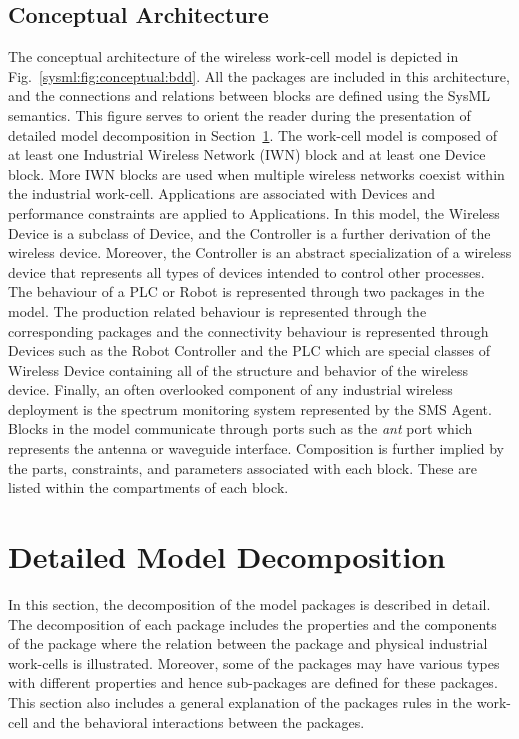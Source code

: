 \subsection{Conceptual Architecture}\label{sysml:sec:architecture}
The conceptual architecture of the wireless work-cell model is depicted in Fig.~\ref{sysml:fig:conceptual:bdd}. All the packages are included in this architecture, and the connections and relations between blocks are defined using the SysML semantics. This figure serves to orient the reader during the presentation of detailed model decomposition in Section~\ref{sysml:sec:detailed-model}. The work-cell model is composed of at least one Industrial Wireless Network (IWN) block and at least one Device block. More IWN blocks are used when multiple wireless networks coexist within the industrial work-cell. Applications are associated with Devices and performance constraints are applied to Applications. In this model, the Wireless Device is a subclass of Device, and the Controller is a further derivation of the wireless device. Moreover, the Controller is an abstract specialization of a wireless device that represents all types of devices intended to control other processes. The behaviour of a PLC or Robot is represented through two packages in the model. The production related behaviour is represented through the corresponding packages and the connectivity behaviour is represented through Devices such as the Robot Controller and the PLC which are special classes of Wireless Device containing all of the structure and behavior of the wireless device. Finally, an often overlooked component of any industrial wireless deployment is the spectrum monitoring system represented by the SMS Agent. Blocks in the model communicate through ports such as the \textit{ant} port which represents the antenna or waveguide interface.  Composition is further implied by the parts, constraints, and parameters associated with each block. These are listed within the compartments of each block.

\section{Detailed Model Decomposition}\label{sysml:sec:detailed-model}
In this section, the decomposition of the model packages is described in detail. The decomposition of each package includes the properties and the components of the package where the relation between the package and physical industrial work-cells is illustrated. Moreover, some of the packages may have various types with different properties and hence sub-packages are defined for these packages. This section also includes a general explanation of the packages rules in the work-cell and the behavioral interactions between the packages.      

